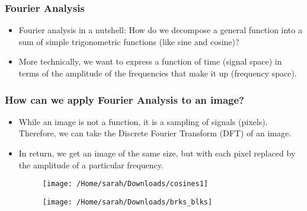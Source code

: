 \documentclass{beamer}
\begin{document}
	\begin{frame}
	\frametitle{Fourier Analysis}
		\begin{itemize}
			\item Fourier analysis in a nutshell: How do we decompose a general function into a sum of simple trigonometric functions (like sine and cosine)?
			\item More technically, we want to express a function of time (signal space) in terms of the amplitude of the frequencies that make it up (frequency space).
		\end{itemize}
	\end{frame}
	
	\begin{frame}
	\frametitle{How can we apply Fourier Analysis to an image?}
		\begin{itemize}
			\item While an image is not a function, it is a sampling of signals (pixels). Therefore, we can take the Discrete Fourier Transform (DFT) of an image.
			\item In return, we get an image of the same size, but with each pixel replaced by the amplitude of a particular frequency.
			\begin{figure}
				\texttt{[image: /Home/sarah/Downloads/cosines1]}
			\end{figure}
			\begin{figure}
				\texttt{[image: /Home/sarah/Downloads/brks\_blks]}
			\end{figure}
		\end{itemize}
	\end{frame}
\end{document}
